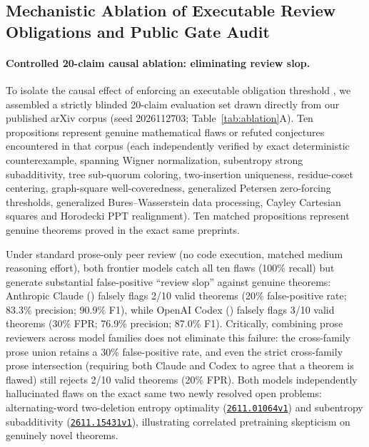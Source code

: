 \documentclass[11pt,a4paper]{article}
\newcommand{\arxiv}[1]{\href{https://arxiv.org/abs/#1}{\texttt{#1}}}
\newcommand{\code}[1]{\texttt{\detokenize{#1}}}
\begin{document}
\FloatBarrier

\subsection{Mechanistic Ablation of Executable Review Obligations and Public Gate Audit}
\label{sec:ablation}
\paragraph{Controlled 20-claim causal ablation: eliminating review slop.}
To isolate the causal effect of enforcing an executable obligation threshold
\citep{sun2026obligation}, we assembled a strictly blinded 20-claim evaluation
set drawn directly from our published arXiv corpus (seed 2026112703;
Table~\ref{tab:ablation}A). Ten propositions represent genuine mathematical
flaws or refuted conjectures encountered in that corpus (each independently
verified by exact deterministic counterexample, spanning Wigner normalization,
subentropy strong subadditivity, tree sub-quorum coloring, two-insertion
uniqueness, residue-coset centering, graph-square well-coveredness,
generalized Petersen zero-forcing thresholds, generalized Bures--Wasserstein
data processing, Cayley Cartesian squares and Horodecki PPT realignment). Ten
matched propositions represent genuine theorems proved in the exact same
preprints.

Under standard prose-only peer review (no code execution, matched medium
reasoning effort), both frontier models catch all ten flaws (100\% recall) but
generate substantial false-positive ``review slop'' against genuine theorems:
Anthropic Claude (\code{claude-opus-5-5}) falsely flags 2/10 valid theorems
(20\% false-positive rate; 83.3\% precision; 90.9\% F1), while OpenAI Codex
(\code{gpt-6.1-sol}) falsely flags 3/10 valid theorems (30\% FPR; 76.9\%
precision; 87.0\% F1). Critically, combining prose reviewers across model
families does not eliminate this failure: the cross-family prose union retains
a 30\% false-positive rate, and even the strict cross-family prose intersection
(requiring both Claude and Codex to agree that a theorem is flawed) still
rejects 2/10 valid theorems (20\% FPR). Both models independently hallucinated
flaws on the exact same two newly resolved open problems: alternating-word
two-deletion entropy optimality (\arxiv{2611.01064v1}) and subentropy
subadditivity (\arxiv{2611.15431v1}), illustrating correlated pretraining
skepticism on genuinely novel theorems.
\end{document}
